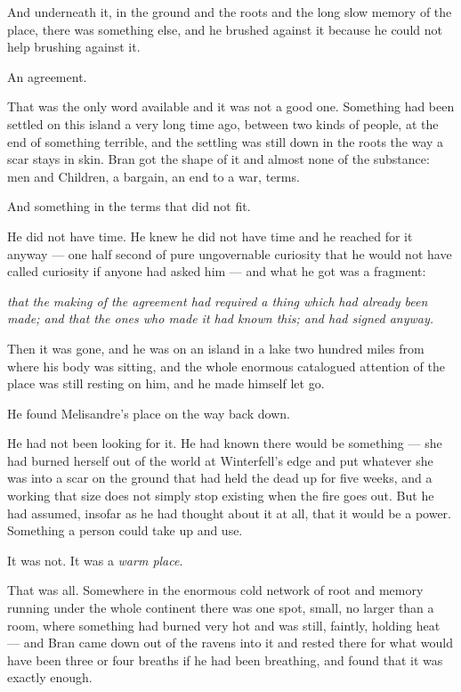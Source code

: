 And underneath it, in the ground and the roots and the long slow memory of the place, there was something else, and he brushed against it because he could not help brushing against it.

An agreement.

That was the only word available and it was not a good one. Something had been settled on this island a very long time ago, between two kinds of people, at the end of something terrible, and the settling was still down in the roots the way a scar stays in skin. Bran got the shape of it and almost none of the substance: men and Children, a bargain, an end to a war, terms.

And something in the terms that did not fit.

He did not have time. He knew he did not have time and he reached for it anyway — one half second of pure ungovernable curiosity that he would not have called curiosity if anyone had asked him — and what he got was a fragment:

\textit{that the making of the agreement had required a thing which had already been made; and that the ones who made it had known this; and had signed anyway.}

Then it was gone, and he was on an island in a lake two hundred miles from where his body was sitting, and the whole enormous catalogued attention of the place was still resting on him, and he made himself let go.

\sceneBreak

He found Melisandre’s place on the way back down.

He had not been looking for it. He had known there would be something — she had burned herself out of the world at Winterfell’s edge and put whatever she was into a scar on the ground that had held the dead up for five weeks, and a working that size does not simply stop existing when the fire goes out. But he had assumed, insofar as he had thought about it at all, that it would be a power. Something a person could take up and use.

It was not. It was a \textit{warm place}.

That was all. Somewhere in the enormous cold network of root and memory running under the whole continent there was one spot, small, no larger than a room, where something had burned very hot and was still, faintly, holding heat — and Bran came down out of the ravens into it and rested there for what would have been three or four breaths if he had been breathing, and found that it was exactly enough.

